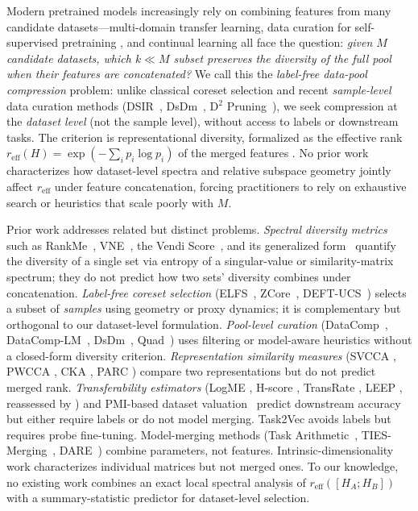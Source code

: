 \documentclass{article}
\newcommand{\reff}{\ensuremath{r_{\mathrm{eff}}}\xspace}
\begin{document}
Modern pretrained models increasingly rely on combining features from many
candidate datasets---multi-domain transfer learning, data curation for
self-supervised pretraining \citep{gadre2023datacomp},
and continual learning all face the question:
\emph{given $M$ candidate datasets, which $k{\ll}M$ subset preserves the
diversity of the full pool when their features are concatenated?}
We call this the \emph{label-free data-pool compression} problem:
unlike classical coreset selection \citep{mirzasoleiman2020coresets}
and recent \emph{sample-level} data curation methods
(DSIR~\citep{xie2023dsir}, DsDm~\citep{engstrom2024dsdm},
D$^2$ Pruning~\citep{maharana2023d2pruning}),
we seek compression at the \emph{dataset level}
(not the sample level), without access to labels or downstream tasks.
The criterion is representational diversity, formalized as the
effective rank $\reff(H)=\exp(-\sum_i p_i\log p_i)$ of the merged features
\citep{roy2007effective,garrido2023rankme}.
No prior work characterizes how dataset-level spectra and relative
subspace geometry jointly affect $\reff$ under feature concatenation,
forcing practitioners to rely on exhaustive search or heuristics
that scale poorly with $M$.

Prior work addresses related but distinct problems.
\emph{Spectral diversity metrics} such as RankMe~\citep{garrido2023rankme},
VNE~\citep{kim2023vne}, the Vendi Score~\citep{friedman2023vendi}, and its
generalized form~\citep{pasarkar2024cousins} quantify the diversity of a
single set via entropy of a singular-value or similarity-matrix spectrum;
they do not predict how two sets' diversity combines under concatenation.
\emph{Label-free coreset selection} (ELFS~\citep{shen2025elfs}, ZCore~\citep{griffin2024zcore}, DEFT-UCS~\citep{das2024deft}) selects a subset of \emph{samples} using geometry or proxy dynamics; it is complementary but orthogonal to our dataset-level formulation.
\emph{Pool-level curation} (DataComp~\citep{gadre2023datacomp}, DataComp-LM~\citep{li2024dclm}, DsDm~\citep{engstrom2024dsdm}, Quad~\citep{zhang2025quad}) uses filtering or model-aware heuristics without a closed-form diversity criterion.
\emph{Representation similarity measures} (SVCCA \citep{raghu2017svcca}, PWCCA \citep{morcos2018pwcca}, CKA \citep{kornblith2019similarity}, PARC \citep{bolya2021parc}) compare two representations but do not predict merged rank.
\emph{Transferability estimators} (LogME \citep{zhang2021logme}, H-score \citep{bao2019hscore}, TransRate \citep{huang2022transrate}, LEEP \citep{li2021nleep}, reassessed by \citet{ibrahim2022newer}) and PMI-based dataset valuation~\citep{zhang2024pmi} predict downstream accuracy but either require labels or do not model merging.
Task2Vec \citep{achille2019task2vec} avoids labels but requires probe fine-tuning.
Model-merging methods (Task Arithmetic~\citep{ilharco2023task}, TIES-Merging~\citep{yadav2023ties}, DARE~\citep{yu2024dare}) combine parameters, not features.
Intrinsic-dimensionality work \citep{pope2021intrinsic,ansuini2019intrinsic} characterizes individual matrices but not merged ones.
To our knowledge, no existing work combines an exact local spectral analysis
of $\reff([H_A;H_B])$ with a summary-statistic predictor for dataset-level selection.
\end{document}
